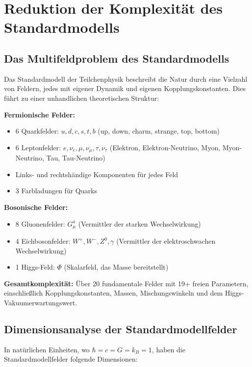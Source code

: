 \documentclass[12pt,a4paper]{report}
\newcommand{\natunits}{\hbar = c = G = k_B = 1} %
\begin{document}
	\section{Reduktion der Komplexität des Standardmodells}
	\label{sec:sm_complexity}
	
	\subsection{Das Multifeldproblem des Standardmodells}
	\label{subsec:multifield_problem}
	
	Das Standardmodell der Teilchenphysik beschreibt die Natur durch eine Vielzahl von Feldern, jedes mit eigener Dynamik und eigenen Kopplungskonstanten. Dies führt zu einer unhandlichen theoretischen Struktur:
	
	\textbf{Fermionische Felder:}
	\begin{itemize}
		\item 6 Quarkfelder: $u, d, c, s, t, b$ (up, down, charm, strange, top, bottom)
		\item 6 Leptonfelder: $e, \nu_e, \mu, \nu_\mu, \tau, \nu_\tau$ (Elektron, Elektron-Neutrino, Myon, Myon-Neutrino, Tau, Tau-Neutrino)
		\item Links- und rechtshändige Komponenten für jedes Feld
		\item 3 Farbladungen für Quarks
	\end{itemize}
	
	\textbf{Bosonische Felder:}
	\begin{itemize}
		\item 8 Gluonenfelder: $G_\mu^a$ (Vermittler der starken Wechselwirkung)
		\item 4 Eichbosonfelder: $W^+, W^-, Z^0, \gamma$ (Vermittler der elektroschwachen Wechselwirkung)
		\item 1 Higgs-Feld: $\Phi$ (Skalarfeld, das Masse bereitstellt)
	\end{itemize}
	
	\textbf{Gesamtkomplexität:}
	Über 20 fundamentale Felder mit 19+ freien Parametern, einschließlich Kopplungskonstanten, Massen, Mischungswinkeln und dem Higgs-Vakuumerwartungswert.
	
	\subsection{Dimensionsanalyse der Standardmodellfelder}
	\label{subsec:dimensional_analysis_sm}
	
	In natürlichen Einheiten, wo $\natunits$, haben die Standardmodellfelder folgende Dimensionen:
	
\end{document}
